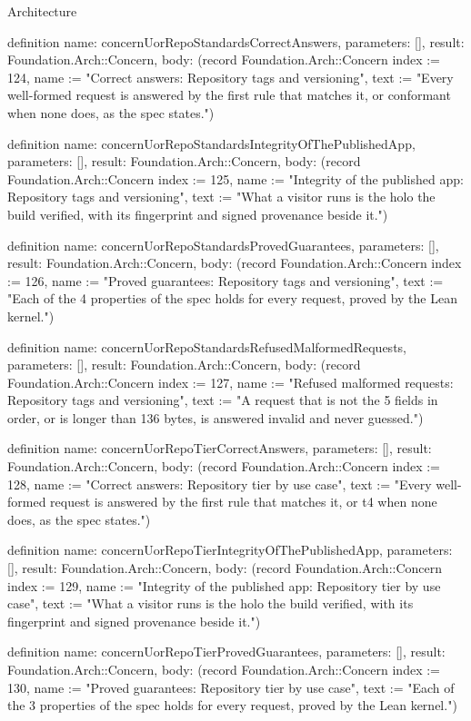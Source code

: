 \begin{lexlean}{Architecture}
\begin{semanticmodule}
definition{
  name: concernUorRepoStandardsCorrectAnswers,
  parameters: [],
  result: Foundation.Arch::Concern,
  body: (record Foundation.Arch::Concern {index := 124, name := "Correct answers: Repository tags and versioning", text := "Every well-formed request is answered by the first rule that matches it, or conformant when none does, as the spec states."})
}

definition{
  name: concernUorRepoStandardsIntegrityOfThePublishedApp,
  parameters: [],
  result: Foundation.Arch::Concern,
  body: (record Foundation.Arch::Concern {index := 125, name := "Integrity of the published app: Repository tags and versioning", text := "What a visitor runs is the holo the build verified, with its fingerprint and signed provenance beside it."})
}

definition{
  name: concernUorRepoStandardsProvedGuarantees,
  parameters: [],
  result: Foundation.Arch::Concern,
  body: (record Foundation.Arch::Concern {index := 126, name := "Proved guarantees: Repository tags and versioning", text := "Each of the 4 properties of the spec holds for every request, proved by the Lean kernel."})
}

definition{
  name: concernUorRepoStandardsRefusedMalformedRequests,
  parameters: [],
  result: Foundation.Arch::Concern,
  body: (record Foundation.Arch::Concern {index := 127, name := "Refused malformed requests: Repository tags and versioning", text := "A request that is not the 5 fields in order, or is longer than 136 bytes, is answered invalid and never guessed."})
}

definition{
  name: concernUorRepoTierCorrectAnswers,
  parameters: [],
  result: Foundation.Arch::Concern,
  body: (record Foundation.Arch::Concern {index := 128, name := "Correct answers: Repository tier by use case", text := "Every well-formed request is answered by the first rule that matches it, or t4 when none does, as the spec states."})
}

definition{
  name: concernUorRepoTierIntegrityOfThePublishedApp,
  parameters: [],
  result: Foundation.Arch::Concern,
  body: (record Foundation.Arch::Concern {index := 129, name := "Integrity of the published app: Repository tier by use case", text := "What a visitor runs is the holo the build verified, with its fingerprint and signed provenance beside it."})
}

definition{
  name: concernUorRepoTierProvedGuarantees,
  parameters: [],
  result: Foundation.Arch::Concern,
  body: (record Foundation.Arch::Concern {index := 130, name := "Proved guarantees: Repository tier by use case", text := "Each of the 3 properties of the spec holds for every request, proved by the Lean kernel."})
}


\end{semanticmodule}
\end{lexlean}
